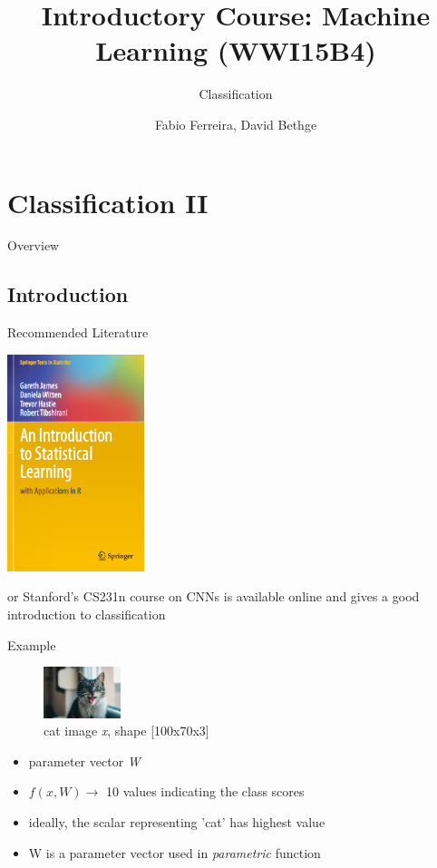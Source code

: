 \documentclass{beamer}
\title[]{Introductory Course: Machine Learning (WWI15B4)}
\subtitle{Classification \rom{2}}
\author{Fabio Ferreira, David Bethge}
\institute{DHBW Karlsruhe}
\date{}
\begin{document}
%
%

\begin{frame}
  \titlepage
\end{frame}



\section{Classification II}
\begin{frame}{Overview}
\tableofcontents
\end{frame}

\subsection{Introduction}
\begin{frame}{Recommended Literature}
\begin{center}
\includegraphics[width=0.3\textwidth]{classification_book}
\end{center}
or Stanford's CS231n course on CNNs is available online and gives a good introduction to classification
\end{frame}

\begin{frame}{Example}
\begin{figure}
\includegraphics[width=0.2\textwidth]{cat}
\caption{cat image \emph{x}, shape [100x70x3]} 
\end{figure}


\begin{itemize}
\item parameter vector \emph{W}
\item $f(x,W) \longrightarrow$ 10 values indicating the class scores
\item ideally, the scalar representing 'cat' has highest value
\item W is a parameter vector used in \emph{parametric} function
\end{itemize}
\end{frame}
\end{document}
